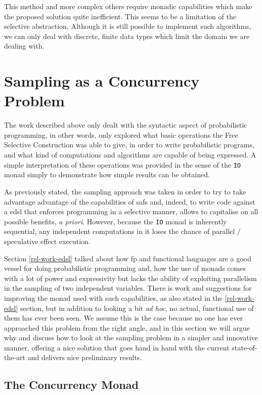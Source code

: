 \documentclass[
  oneside,
  11pt, a4paper,
  footinclude=true,
  headinclude=true,
  cleardoublepage=empty
]{scrbook}
\theoremstyle{definition}
\theoremstyle{definition}
\begin{document}
    This method and more complex others require monadic capabilities which make the proposed solution quite inefficient. This seems to be a limitation of the selective abstraction. Although it is still possible to implement such algorithms, we can only deal with discrete, finite data types which limit the domain we are dealing with.
    
    \section{Sampling as a Concurrency Problem}\label{prob-conc}
    
    The work described above only dealt with the syntactic aspect of probabilistic programming, in other words, only explored what basic operations the Free Selective Construction was able to give, in order to write probabilistic programs, and what kind of computations and algorithms are capable of being expressed. A simple interpretation of these operations was provided in the sense of the \texttt{IO} monad simply to demonstrate how simple results can be obtained.
    
    As previously stated, the sampling approach was taken in order to try to take advantage advantage of the capabilities of \glspl{saf} and, indeed, to write code against a \gls{edsl} that enforces programming in a selective manner, allows to capitalise on all possible benefits, \emph{a priori}. However, because the \texttt{IO} monad is inherently sequential, any independent computations in it loses the chance of parallel / speculative effect execution.
    
    Section \ref{rel-work-edsl} talked about how \gls{fp} and functional languages are a good vessel for doing probabilistic programming and, how the use of monads comes with a lot of power and expressivity but lacks the ability of exploiting parallelism in the sampling of two independent variables. There is work and suggestions for improving the monad used with such capabilities, as also stated in the \ref{rel-work-edsl} section, but in addition to looking a bit \emph{ad hoc}, no actual, functional use of them has ever been seen. We assume this is the case because no one has ever approached this problem from the right angle, and in this section we will argue why and discuss how to look at the sampling problem in a simpler and innovative manner, offering a nice solution that goes hand in hand with the current state-of-the-art and delivers nice preliminary results.
    
    \subsection{The Concurrency Monad}
    
\end{document}
